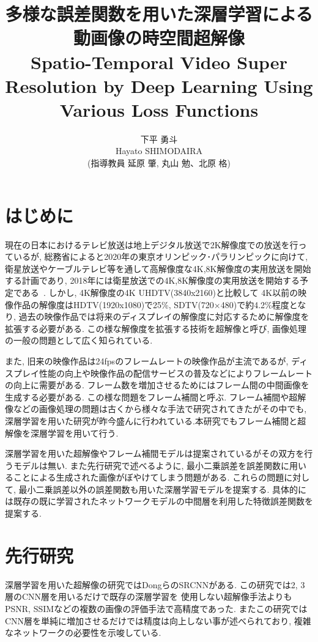 \documentclass[twocolumn, a4j, uplatex]{jsarticle}
\title{{\Large 多様な誤差関数を用いた深層学習による動画像の時空間超解像} \\
Spatio-Temporal Video Super Resolution by Deep Learning Using Various Loss Functions}
\author{{\Large 下平 勇斗} \\ Hayato SHIMODAIRA \\ (指導教員 延原 肇, 丸山 勉、北原 格)}
\begin{document}
\maketitle
\thispagestyle{headings}
\section{はじめに}
現在の日本におけるテレビ放送は地上デジタル放送で2K解像度での放送を行っているが,
総務省によると2020年の東京オリンピック･パラリンピックに向けて,
衛星放送やケーブルテレビ等を通して高解像度な4K,8K解像度の実用放送を開始する計画であり,
2018年には衛星放送での4K,8K解像度の実用放送を開始する予定である~\cite{soumu}.
しかし, 4K解像度の4K UHDTV(3840x2160)と比較して
4K以前の映像作品の解像度はHDTV(1920x1080)で25\%, SDTV(720×480)で約4.2\%程度となり,
過去の映像作品では将来のディスプレイの解像度に対応するために解像度を拡張する必要がある.
この様な解像度を拡張する技術を超解像と呼び, 画像処理の一般の問題として広く知られている.

また, 旧来の映像作品は24fpsのフレームレートの映像作品が主流であるが,
ディスプレイ性能の向上や映像作品の配信サービスの普及などによりフレームレートの向上に需要がある.
フレーム数を増加させるためにはフレーム間の中間画像を生成する必要がある.
この様な問題をフレーム補間と呼ぶ.
フレーム補間や超解像などの画像処理の問題は古くから様々な手法で研究されてきたがその中でも,
深層学習を用いた研究が昨今盛んに行われている.本研究でもフレーム補間と超解像を深層学習を用いて行う.

深層学習を用いた超解像やフレーム補間モデルは提案されているがその双方を行うモデルは無い.
また先行研究で述べるように, 最小二乗誤差を誤差関数に用いることによる生成された画像がぼやけてしまう問題がある.
これらの問題に対して, 最小二乗誤差以外の誤差関数も用いた深層学習モデルを提案する.
具体的には既存の既に学習されたネットワークモデルの中間層を利用した特徴誤差関数を提案する.

\section{先行研究}
深層学習を用いた超解像の研究ではDongらのSRCNN\cite{Dong2015}がある.
この研究では2, 3層のCNN層を用いるだけで既存の深層学習を
使用しない超解像手法よりもPSNR, SSIMなどの複数の画像の評価手法で高精度であった.
またこの研究ではCNN層を単純に増加させるだけでは精度は向上しない事が述べられており,
複雑なネットワークの必要性を示唆している.
\end{document}
